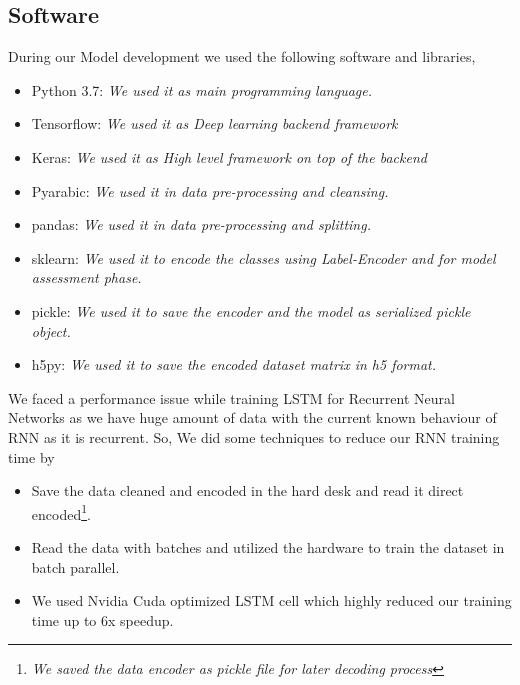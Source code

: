 \subsection{Software}

During our Model development we used the following software and libraries,

\begin{itemize}
\item Python 3.7: \textit{We used it as main programming language.}
\item Tensorflow: \textit{We used it as Deep learning backend framework}
\item Keras: \textit{We used it as High level framework on top of the backend}
\item Pyarabic: \textit{We used it in data pre-processing and cleansing.}
\item pandas: \textit{We used it in data pre-processing and splitting.}
\item sklearn: \textit{We used it to encode the classes using Label-Encoder and for model assessment phase.}
\item pickle: \textit{We used it to save the encoder and the model as serialized pickle object.}
\item h5py: \textit{We used it to save the encoded dataset matrix in h5 format.}
\end{itemize}

We faced a performance issue while training LSTM for Recurrent Neural Networks as we have huge amount of data with the current known behaviour of RNN as it is recurrent. So, We did some techniques to reduce our RNN training time by
\begin{itemize}
\item Save the data cleaned and encoded in the hard desk and read it direct encoded\footnote{\textit{We saved the data encoder as pickle file for later decoding process}}.
\item Read the data with batches and utilized the hardware to train the dataset in batch parallel.
\item We used Nvidia Cuda optimized LSTM cell which highly reduced our training time up to 6x speedup.
   
\end{itemize}



